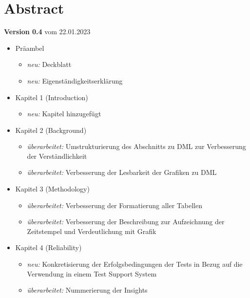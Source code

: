 \cleardoublepage

\chapter*{Abstract}
    
    \large
    \textbf{Version 0.4}
    \normalsize
    vom 22.01.2023 \\
   
   	\begin{itemize}
   		\item Präambel
		\begin{itemize}
  			\item \textit{neu:} Deckblatt
  			\item \textit{neu:} Eigenständigkeitserklärung
		\end{itemize}

		\item Kapitel 1 (Introduction)
		\begin{itemize}
  			\item \textit{neu:} Kapitel hinzugefügt
		\end{itemize}
		
		\item Kapitel 2 (Background)
		\begin{itemize}
  			\item \textit{überarbeitet:} Umstrukturierung des Abschnitts zu DML zur Verbesserung der Verständlichkeit
  			\item \textit{überarbeitet:} Verbesserung der Lesbarkeit der Grafiken zu DML
		\end{itemize}

		\item Kapitel 3 (Methodology)
		\begin{itemize}
  			\item \textit{überarbeitet:} Verbesserung der Formatierung aller Tabellen
  			\item \textit{überarbeitet:} Verbesserung der Beschreibung zur Aufzeichnung der Zeitstempel und Verdeutlichung mit Grafik
		\end{itemize}
		
		\item Kapitel 4 (Reliability)
		\begin{itemize}
  			\item \textit{neu:} Konkretisierung der Erfolgsbedingungen der Tests in Bezug auf die Verwendung in einem Test Support System
  			\item \textit{überarbeitet:} Nummerierung der Insights
		\end{itemize}
		

\end{itemize}
